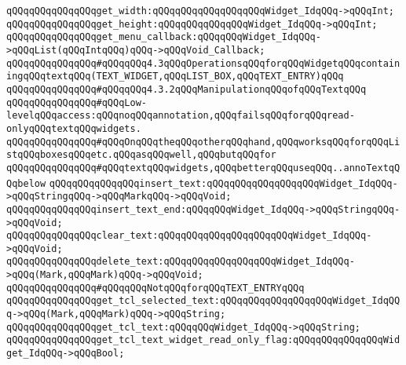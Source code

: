\verb|qQQqqQQqqQQqqQQqget_width:qQQqqQQqqQQqqQQqqQQqWidget_IdqQQq->qQQqInt;|\newline
\verb|qQQqqQQqqQQqqQQqget_height:qQQqqQQqqQQqqQQqWidget_IdqQQq->qQQqInt;|\newline
\verb|qQQqqQQqqQQqqQQqget_menu_callback:qQQqqQQqWidget_IdqQQq->qQQqList(qQQqIntqQQq)qQQq->qQQqVoid_Callback;|\newline
\newline
\newline
\newline
\verb|qQQqqQQqqQQqqQQq#qQQqqQQq4.3qQQqOperationsqQQqforqQQqWidgetqQQqcontainingqQQqtextqQQq(TEXT_WIDGET,qQQqLIST_BOX,qQQqTEXT_ENTRY)qQQq|\newline
\newline
\verb|qQQqqQQqqQQqqQQq#qQQqqQQq4.3.2qQQqManipulationqQQqofqQQqTextqQQq|\newline
\newline
\verb|qQQqqQQqqQQqqQQq#qQQqLow-levelqQQqaccess:qQQqnoqQQqannotation,qQQqfailsqQQqforqQQqread-onlyqQQqtextqQQqwidgets.|\newline
\verb|qQQqqQQqqQQqqQQq#qQQqOnqQQqtheqQQqotherqQQqhand,qQQqworksqQQqforqQQqListqQQqboxesqQQqetc.qQQqasqQQqwell,qQQqbutqQQqfor|\newline
\verb|qQQqqQQqqQQqqQQq#qQQqtextqQQqwidgets,qQQqbetterqQQquseqQQq..annoTextqQQqbelow|\newline
\verb|qQQqqQQqqQQqqQQqinsert_text:qQQqqQQqqQQqqQQqqQQqWidget_IdqQQq->qQQqStringqQQq->qQQqMarkqQQq->qQQqVoid;|\newline
\verb|qQQqqQQqqQQqqQQqinsert_text_end:qQQqqQQqWidget_IdqQQq->qQQqStringqQQq->qQQqVoid;|\newline
\newline
\verb|qQQqqQQqqQQqqQQqclear_text:qQQqqQQqqQQqqQQqqQQqqQQqWidget_IdqQQq->qQQqVoid;|\newline
\verb|qQQqqQQqqQQqqQQqdelete_text:qQQqqQQqqQQqqQQqqQQqWidget_IdqQQq->qQQq(Mark,qQQqMark)qQQq->qQQqVoid;|\newline
\newline
\verb|qQQqqQQqqQQqqQQq#qQQqqQQqNotqQQqforqQQqTEXT_ENTRYqQQq|\newline
\verb|qQQqqQQqqQQqqQQqget_tcl_selected_text:qQQqqQQqqQQqqQQqqQQqWidget_IdqQQq->qQQq(Mark,qQQqMark)qQQq->qQQqString;|\newline
\verb|qQQqqQQqqQQqqQQqget_tcl_text:qQQqqQQqWidget_IdqQQq->qQQqString;|\newline
\newline
\verb|qQQqqQQqqQQqqQQqget_tcl_text_widget_read_only_flag:qQQqqQQqqQQqqQQqWidget_IdqQQq->qQQqBool;|\newline

